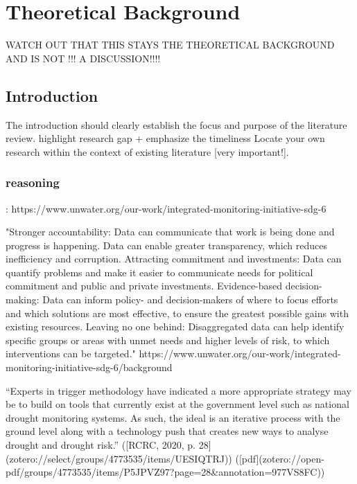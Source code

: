 
\chapter{Theoretical Background} %

\label{Chapter2} %
WATCH  OUT THAT THIS STAYS THE THEORETICAL BACKGROUND AND IS NOT !!! A DISCUSSION!!!!

\section{Introduction}
The introduction should clearly establish the focus and purpose of the literature review.
highlight research gap + emphasize the timeliness
Locate your own research within the context of existing literature [very important!]. 


\subsection{reasoning}:
https://www.unwater.org/our-work/integrated-monitoring-initiative-sdg-6

"Stronger accountability: Data can communicate that work is being done and progress is happening. Data can enable greater transparency, which reduces inefficiency and corruption.
Attracting commitment and investments: Data can quantify problems and make it easier to communicate needs for political commitment and public and private investments.
Evidence-based decision-making: Data can inform policy- and decision-makers of where to focus efforts and which solutions are most effective, to ensure the greatest possible gains with existing resources.
Leaving no one behind: Disaggregated data can help identify specific groups or areas with unmet needs and higher levels of risk, to which interventions can be targeted."
https://www.unwater.org/our-work/integrated-monitoring-initiative-sdg-6/background

“Experts in trigger methodology have indicated a more appropriate strategy may be to build on tools that currently exist at the government level such as national drought monitoring systems. As such, the ideal is an iterative process with the ground level along with a technology push that creates new ways to analyse drought and drought risk.” ([RCRC, 2020, p. 28](zotero://select/groups/4773535/items/UESIQTRJ)) ([pdf](zotero://open-pdf/groups/4773535/items/P5JPVZ97?page=28&annotation=977VS8FC))

